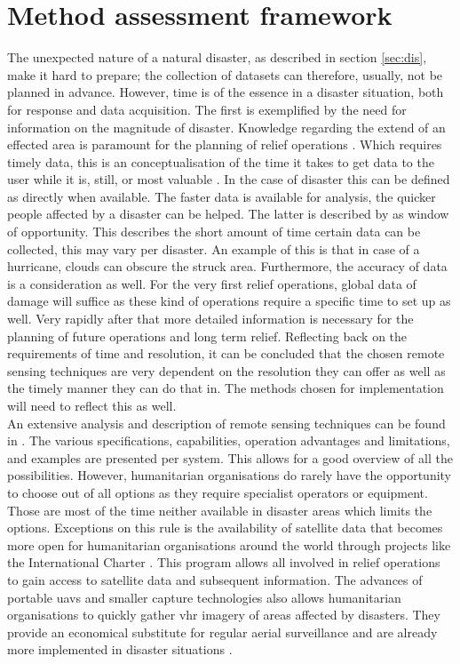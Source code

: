 \section{Method assessment framework}\label{sec:framework}

The unexpected nature of a natural disaster, as described in section \ref{sec:dis}, make it hard to prepare; the collection of datasets can therefore, usually, not be planned in advance. However, time is of the essence in a disaster situation, both for response and data acquisition. The first is exemplified by the need for information on the magnitude of disaster. Knowledge regarding the extend of an effected area is paramount for the planning of relief operations \citep{AlAchkar2008, Schweier2006}. Which requires timely data, this is an conceptualisation of the time it takes to get data to the user while it is, still, or most valuable \citep{Christopher2015}. In the case of disaster this can be defined as directly when available. The faster data is available for analysis, the quicker people affected by a disaster can be helped. The latter is described by \citet{Christopher2015} as window of opportunity. This describes the short amount of time certain data can be collected, this may vary per disaster. An example of this is that in case of a hurricane, clouds can obscure the struck area. Furthermore, the accuracy of data is a consideration as well. For the very first relief operations, global data of damage will suffice as these kind of operations require a specific time to set up as well. Very rapidly after that more detailed information is necessary for the planning of future operations and long term relief. Reflecting back on the requirements of time and resolution, it can be concluded that the chosen remote sensing techniques are very dependent on the resolution they can offer as well as the timely manner they can do that in. The methods chosen for implementation will need to reflect this as well.\\

\noindent An extensive analysis and description of remote sensing techniques can be found in \citet{Kerle2008}. The various specifications, capabilities, operation advantages and limitations, and examples are presented per system. This allows for a good overview of all the possibilities. However, humanitarian organisations do rarely have the opportunity to choose out of all options as they require specialist operators or equipment. Those are most of the time neither available in disaster areas which limits the options. Exceptions on this rule is the availability of satellite data that becomes more open for humanitarian organisations around the world through projects like the International Charter \citep{Voigt2016}. This program allows all involved in relief operations to gain access to satellite data and subsequent information. The advances of portable \ac{uav}s and smaller capture technologies also allows humanitarian organisations to quickly gather \ac{vhr} imagery of areas affected by disasters. They provide an economical substitute for regular aerial surveillance \citep{Nex2014} and are already more implemented in disaster situations \citep{Lieshout2017,Johnson2017}.\\

